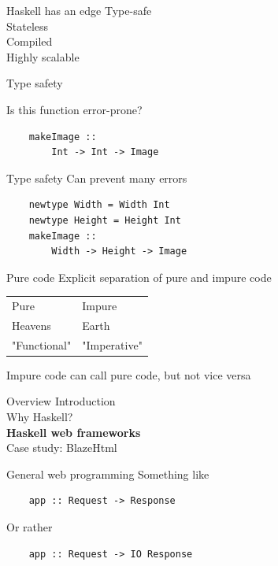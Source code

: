 \documentclass[20pt]{beamer}
\newcommand{\vspaced}{
    \vspace{5mm}
}
\begin{document}
\begin{frame}{Haskell has an edge}
    Type-safe \\
    Stateless \\
    Compiled \\
    Highly scalable
\end{frame}

\begin{frame}[t, fragile]{Type safety}
    \vspaced
    Is this function error-prone?
    \begin{lstlisting}
    makeImage ::
        Int -> Int -> Image
    \end{lstlisting}
\end{frame}

\begin{frame}[fragile]{Type safety}
    Can prevent many errors
    \begin{lstlisting}
    newtype Width = Width Int
    newtype Height = Height Int
    makeImage ::
        Width -> Height -> Image
    \end{lstlisting}
\end{frame}

\begin{frame}{Pure code}
    Explicit separation of pure and impure code \\
    \vspaced
    \begin{tabular}{l|l}
        Pure         & Impure \\
        Heavens      & Earth  \\
        "Functional" & "Imperative"
    \end{tabular}
    \newline
    \vspaced

    Impure code can call pure code, but not vice versa
\end{frame}


\begin{frame}{Overview}
    Introduction \\
    Why Haskell? \\
    \textbf{Haskell web frameworks} \\
    Case study: BlazeHtml
\end{frame}

\begin{frame}[fragile]{General web programming}
    Something like
    \begin{lstlisting}
    app :: Request -> Response
    \end{lstlisting}

    \vspaced
    Or rather
    \begin{lstlisting}
    app :: Request -> IO Response
    \end{lstlisting}
\end{frame}
\end{document}
